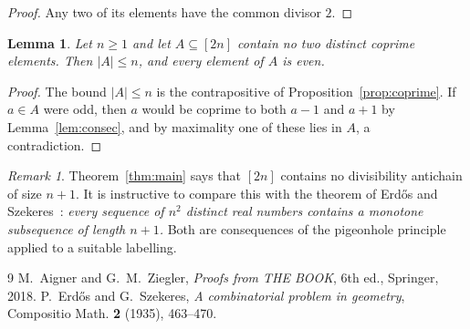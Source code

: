 \documentclass[11pt]{amsart}
\newtheorem{lemma}[theorem]{Lemma}
\theoremstyle{definition}
\theoremstyle{remark}
\newtheorem*{remark}{Remark}
\begin{document}
\begin{proof}
Any two of its elements have the common divisor $2$.
\end{proof}

\begin{lemma}\label{lem:nocop}
Let $n\ge 1$ and let $A\subseteq[2n]$ contain no two distinct coprime
elements. Then $|A|\le n$, and every element of $A$ is even.
\end{lemma}

\begin{proof}
The bound $|A|\le n$ is the contrapositive of Proposition~\ref{prop:coprime}.
If $a\in A$ were odd, then $a$ would be coprime to both $a-1$ and $a+1$ by
Lemma~\ref{lem:consec}, and by maximality one of these lies in $A$, a
contradiction.
\end{proof}

\begin{remark}
Theorem~\ref{thm:main} says that $[2n]$ contains no divisibility antichain of
size $n+1$. It is instructive to compare this with the theorem of
Erd\H{o}s and Szekeres~\cite{ES}: \emph{every sequence of $n^2$ distinct real
numbers contains a monotone subsequence of length $n+1$.} Both are
consequences of the pigeonhole principle applied to a suitable labelling.
\end{remark}

\begin{thebibliography}{9}
 M.~Aigner and G.~M.~Ziegler, \emph{Proofs from THE BOOK},
6th ed., Springer, 2018.
 P.~Erd\H{o}s and G.~Szekeres, \emph{A combinatorial problem in
geometry}, Compositio Math. \textbf{2} (1935), 463--470.
\end{thebibliography}
\end{document}
